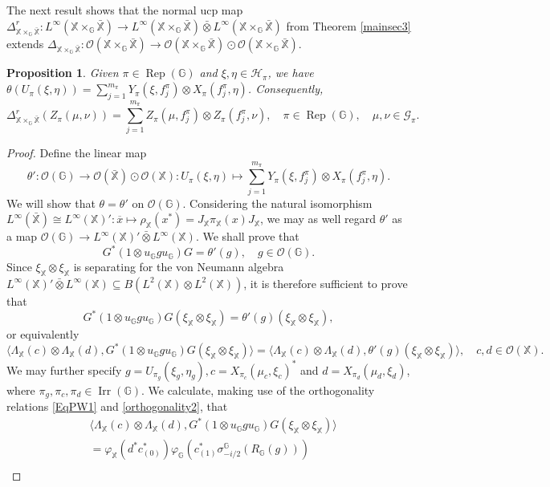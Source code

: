 \documentclass[reqno]{amsart}
\numberwithin{equation}{section}
\newtheorem{Prop}[Theorem]{Proposition}
\newcommand\XGX{\X\times_\G \bar{\X}}
\DeclareMathOperator{\Rep}{\mathrm{Rep}}
\DeclareMathOperator{\Irr}{\mathrm{Irr}}
\newcommand{\mcG}{\mathcal{G}}
\newcommand{\mcH}{\mathcal{H}}
\newcommand{\mcO}{\mathcal{O}}
\newcommand{\G}{\mathbb{G}}
\newcommand{\X}{\mathbb{X}}
\newcommand{\ovot}{\bar{\otimes}}
\begin{document}
The next result shows that the normal ucp map
$\Delta_{\X\times_\G \bar{\X}}^r: L^\infty(\XGX)\to L^\infty(\XGX)\ovot L^\infty(\XGX)$
from Theorem \ref{mainsec3} extends $\Delta_{\XGX}: \mcO(\XGX)\to \mcO(\XGX)\odot \mcO(\XGX)$.
\begin{Prop} Given $\pi\in \Rep(\G)$ and $\xi, \eta \in \mcH_\pi$, we have
    $\theta(U_\pi(\xi, \eta))= \sum_{j=1}^{m_\pi} Y_\pi(\xi, f_j^\pi)\otimes X_\pi(f_j^\pi, \eta)$. Consequently, 
    \begin{equation}\label{actionmatrixcoefficients}
        \Delta_{\XGX}^r(Z_\pi(\mu, \nu))= \sum_{j=1}^{m_\pi} Z_\pi(\mu, f_j^\pi)\otimes Z_\pi(f_j^\pi, \nu), \quad \pi\in \Rep(\G), \quad \mu, \nu \in \mcG_\pi.
    \end{equation}
\end{Prop}
\begin{proof} Define the linear map
$$\theta': \mcO(\G)\to \mcO(\bar{\X})\odot \mcO(\X): U_\pi(\xi, \eta) \mapsto \sum_{j=1}^{m_\pi} Y_\pi(\xi, f_j^\pi)\otimes X_\pi(f_j^\pi, \eta).$$
We will show that $\theta = \theta'$ on $\mcO(\G)$.
Considering the natural isomorphism $L^\infty(\bar{\X})\cong L^\infty(\X)': \overline{x} \mapsto \rho_\X(x^*) = J_\X \pi_\X(x) J_\X$, we may as well regard $\theta'$ as a map $\mathcal{O}(\G)\to L^\infty(\X)'\ovot L^\infty(\X)$. We shall prove that
 $$G^*(1\otimes u_\G g u_\G)G = \theta'(g), \quad g \in \mathcal{O}(\G).$$
  Since $\xi_\X \otimes \xi_\X$ is separating for the von Neumann algebra $L^\infty(\X)'\ovot L^\infty(\X)\subseteq B(L^2(\X)\otimes L^2(\X))$, it is therefore sufficient to prove that
 $$G^*(1\otimes u_\G g u_\G) G(\xi_\X \otimes \xi_\X) = \theta'(g)(\xi_\X \otimes \xi_\X),$$
 or equivalently
 \begin{equation}\label{toprove}
     \langle \Lambda_\X(c)\otimes \Lambda_\X(d), G^*(1\otimes u_\G g u_\G )G(\xi_\X \otimes \xi_\X)\rangle = \langle \Lambda_\X(c)\otimes \Lambda_\X(d), \theta'(g)(\xi_\X\otimes \xi_\X)\rangle, \quad c,d \in \mathcal{O}(\X).
 \end{equation}
 We may further specify $g = U_{\pi_g}(\xi_g, \eta_g), c= X_{\pi_c}(\mu_c, \xi_c)^*$ and $d= X_{\pi_d}(\mu_d, \xi_d)$, where $\pi_g, \pi_c, \pi_d\in \Irr(\G)$. We calculate, making use of the orthogonality relations \eqref{EqPW1} and \eqref{orthogonality2}, that
 \begin{align*}
     &\langle \Lambda_\X(c)\otimes \Lambda_\X(d), G^*(1\otimes u_\G  g u_\G)G(\xi_\X \otimes \xi_\X)\rangle \\
     &= \varphi_\X(d^*c_{(0)}^*) \varphi_\G(c_{(1)}^* \sigma_{-i/2}^\G(R_\G(g)))\\

\end{align*}
\end{proof}
\end{document}
